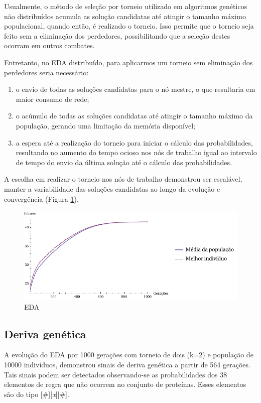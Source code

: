 Usualmente, o método de seleção por torneio utilizado em algoritmos genéticos não distribuídos acumula as solução candidatas até atingir o tamanho máximo populacional, quando então, é realizado o torneio. Isso permite que o torneio seja feito sem a eliminação dos perdedores, possibilitando que a seleção destes ocorram em outros combates.

Entretanto, no EDA distribuído, para aplicarmos um torneio sem eliminação dos perdedores seria necessário:

\begin{enumerate}
	\item o envio de todas as soluções candidatas para o nó mestre, o que resultaria em maior consumo de rede;
	\item o acúmulo de todas as soluções candidatas até atingir o tamanho máximo da população, gerando uma limitação da memória disponível;
	\item a espera até a realização do torneio para iniciar o cálculo das probabilidades, resultando no aumento do tempo ocioso nos nós de trabalho igual ao intervalo de tempo do envio da última solução até o cálculo das probabilidades.
\end{enumerate} 

A escolha em realizar o torneio nos nós de trabalho demonstrou ser escalável, manter a variabilidade das soluções candidatas ao longo da evolução e convergência (Figura \ref{fig:evo_eda}).

\begin{figure}
  \centering
  \includegraphics[width=1\textwidth]{figures/evo_Eda.pdf}
  \caption{EDA}
        \label{fig:evo_eda}
\end{figure}

\subsection{Deriva genética}

A evolução do EDA por 1000 gerações com torneio de dois (k=2) e população de 10000 indivíduos, demonstrou sinais de deriva genética a partir de 564 gerações. Tais sinais podem ser detectados observando-se as probabilidades dos 38 elementos de regra que não ocorrem no conjunto de proteínas. Esses elementos são do tipo [\#][\textit{x}][\#].

